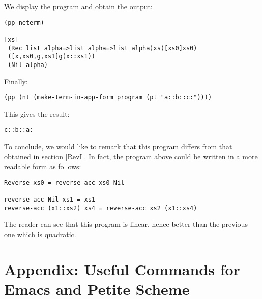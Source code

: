 \documentclass[12pt]{amsart}
\begin{document}


We display the program and obtain the output:
\begin{verbatim}
(pp neterm)

[xs]
 (Rec list alpha=>list alpha=>list alpha)xs([xs0]xs0)
 ([x,xs0,g,xs1]g(x::xs1))
 (Nil alpha)
\end{verbatim}

Finally:
\begin{verbatim}
(pp (nt (make-term-in-app-form program (pt "a::b::c:"))))
\end{verbatim}
This gives the result:
\begin{verbatim}
c::b::a:
\end{verbatim}

To conclude, we would like to remark that this program differs from
that obtained in section \ref{RevI}.  In fact, the program above could
be written in a more readable form as follows:
\begin{verbatim}
Reverse xs0 = reverse-acc xs0 Nil

reverse-acc Nil xs1 = xs1
reverse-acc (x1::xs2) xs4 = reverse-acc xs2 (x1::xs4)
\end{verbatim}
The reader can see that this program is linear, hence better than the
previous one which is quadratic.

\newpage


\section{Appendix: Useful Commands for Emacs and Petite Scheme}
\end{document}
